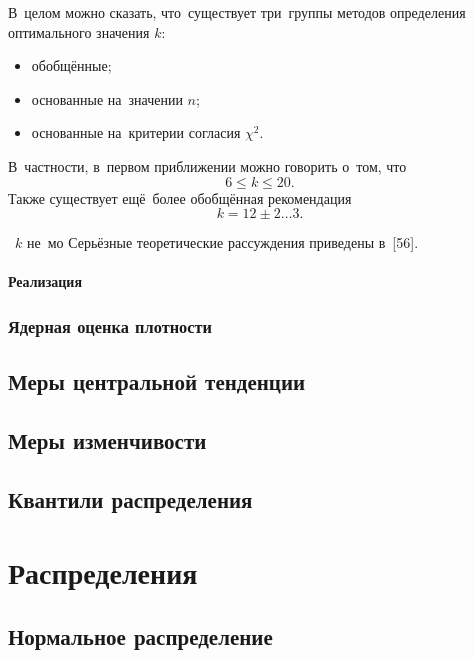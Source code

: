 \documentclass[]{scrartcl}
\begin{document}
В~целом можно сказать, что~существует три~группы методов определения оптимального значения $k$:
	\begin{itemize}
		\item обобщённые;
		\item основанные на~значении $n$;
		\item основанные на~критерии согласия $\chi^{2}$.
	\end{itemize}
В~частности, в~первом приближении можно говорить о~том, что
\begin{equation}\label{n-k-Nowiczkij-1}
6 \leq k \leq 20.
\end{equation}
Также существует ещё~более обобщённая рекомендация
\begin{equation}\label{n-k-Nowiczkij-2}
k = 12 \pm 2 \ldots 3.
\end{equation}


~$k$ не~мо Серьёзные теоретические рассуждения приведены в~[56].

\paragraph{Реализация}
\par

\subsubsection{Ядерная оценка плотности}
\subsection{Меры центральной тенденции}

\subsection{Меры изменчивости}

\subsection{Квантили распределения}

\section{Распределения}

\subsection{Нормальное распределение}
\end{document}
